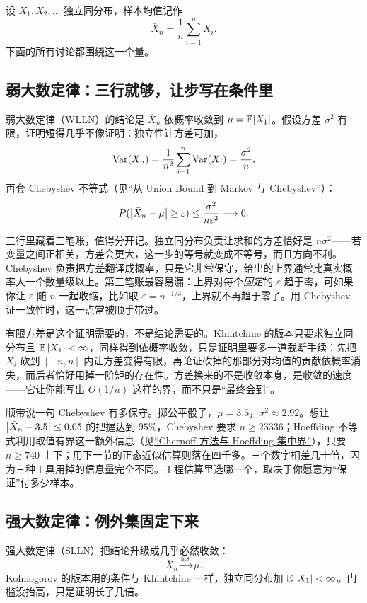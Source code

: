 设 \(X_1,X_2,\ldots\) 独立同分布，样本均值记作
\[
\bar X_n=\frac1n\sum_{i=1}^n X_i.
\]
下面的所有讨论都围绕这一个量。

\subsection{弱大数定律：三行就够，让步写在条件里}

弱大数定律（WLLN）的结论是 \(\bar X_n\) 依概率收敛到 \(\mu=\mathbb{E}[X_1]\)。假设方差 \(\sigma^2\) 有限，证明短得几乎不像证明：独立性让方差可加，
\[
\operatorname{Var}(\bar X_n)=\frac1{n^2}\sum_{i=1}^n\operatorname{Var}(X_i)=\frac{\sigma^2}{n},
\]
再套 Chebyshev 不等式（见\hyperref[sec:05-Probability/07-Transforms-and-Bounds/02]{``从 Union Bound 到 Markov 与 Chebyshev''}）：
\[
P(\left|\bar X_n-\mu\right|\ge\varepsilon)\le\frac{\sigma^2}{n\varepsilon^2}\longrightarrow0 .
\]

三行里藏着三笔账，值得分开记。独立同分布负责让求和的方差恰好是 \(n\sigma^2\)——若变量之间正相关，方差会更大，这一步的等号就变成不等号，而且方向不利。Chebyshev 负责把方差翻译成概率，只是它非常保守，给出的上界通常比真实概率大一个数量级以上。第三笔账最容易漏：上界对每个\emph{固定}的 \(\varepsilon\) 趋于零，可如果你让 \(\varepsilon\) 随 \(n\) 一起收缩，比如取 \(\varepsilon=n^{-1/3}\)，上界就不再趋于零了。用 Chebyshev 证一致性时，这一点常被顺手带过。

有限方差是这个证明需要的，不是结论需要的。Khintchine 的版本只要求独立同分布且 \(\mathbb{E}\left|X_1\right|<\infty\)，同样得到依概率收敛，只是证明里要多一道截断手续：先把 \(X_i\) 砍到 \([-n,n]\) 内让方差变得有限，再论证砍掉的那部分对均值的贡献依概率消失，而后者恰好用掉一阶矩的存在性。方差换来的不是收敛本身，是收敛的速度——它让你能写出 \(O(1/n)\) 这样的界，而不只是``最终会到''。

顺带说一句 Chebyshev 有多保守。掷公平骰子，\(\mu=3.5\)，\(\sigma^2\approx2.92\)。想让 \(\left|\bar X_n-3.5\right|\le0.05\) 的把握达到 \(95\%\)，Chebyshev 要求 \(n\ge23336\)；Hoeffding 不等式利用取值有界这一额外信息（见\hyperref[sec:05-Probability/07-Transforms-and-Bounds/04]{``Chernoff 方法与 Hoeffding 集中界''}），只要 \(n\ge740\) 上下；用下一节的正态近似估算则落在四千多。三个数字相差几十倍，因为三种工具用掉的信息量完全不同。工程估算里选哪一个，取决于你愿意为``保证''付多少样本。

\subsection{强大数定律：例外集固定下来}

强大数定律（SLLN）把结论升级成几乎必然收敛：
\[
\bar X_n\xrightarrow{\text{a.s.}}\mu .
\]
Kolmogorov 的版本用的条件与 Khintchine 一样，独立同分布加 \(\mathbb{E}\left|X_1\right|<\infty\)。门槛没抬高，只是证明长了几倍。

